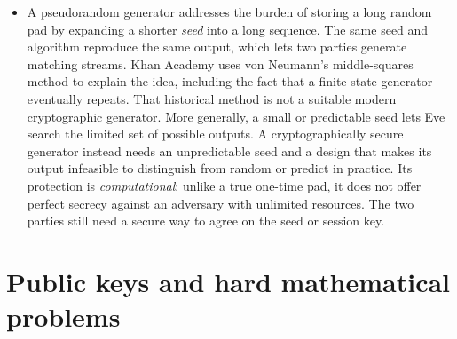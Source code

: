 \documentclass[10pt]{article}
\begin{document}
\begin{itemize}[leftmargin=1.25em, itemsep=0.3em, parsep=0pt, topsep=0pt]
    \item A pseudorandom generator addresses the burden of storing a long random pad by expanding a shorter \textit{seed} into a long sequence. The same seed and algorithm reproduce the same output, which lets two parties generate matching streams. Khan Academy uses von Neumann's middle-squares method to explain the idea, including the fact that a finite-state generator eventually repeats. That historical method is not a suitable modern cryptographic generator. More generally, a small or predictable seed lets Eve search the limited set of possible outputs. A cryptographically secure generator instead needs an unpredictable seed and a design that makes its output infeasible to distinguish from random or predict in practice. Its protection is \textit{computational}: unlike a true one-time pad, it does not offer perfect secrecy against an adversary with unlimited resources. The two parties still need a secure way to agree on the seed or session key.
\end{itemize}

\section*{Public keys and hard mathematical problems}
\end{document}
